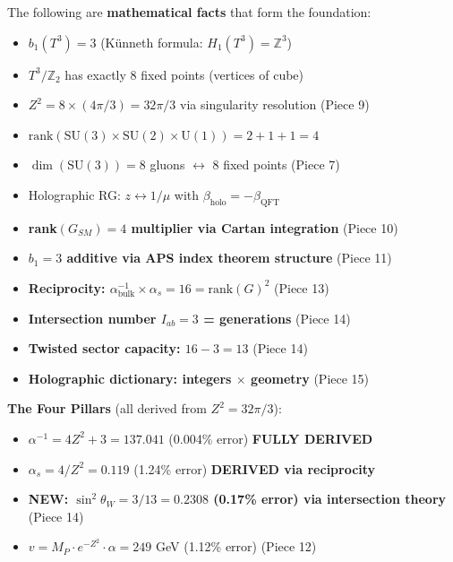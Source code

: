 \documentclass[12pt,a4paper]{article}
\newcommand{\sinW}{\sin^2\theta_W}
\newcommand{\Zsq}{Z^2}
\begin{document}
\begin{tcolorbox}[colback=green!10!white, colframe=green!60!black, title=What Is Established (v8.8.0)]
The following are \textbf{mathematical facts} that form the foundation:
\begin{itemize}[itemsep=0pt]
    \item[\checkmark] $b_1(T^3) = 3$ (K\"unneth formula: $H_1(T^3) = \mathbb{Z}^3$)
    \item[\checkmark] $T^3/\mathbb{Z}_2$ has exactly 8 fixed points (vertices of cube)
    \item[\checkmark] $\Zsq = 8 \times (4\pi/3) = 32\pi/3$ via singularity resolution (Piece 9)
    \item[\checkmark] $\text{rank}(\text{SU}(3) \times \text{SU}(2) \times \text{U}(1)) = 2 + 1 + 1 = 4$
    \item[\checkmark] $\dim(\text{SU}(3)) = 8$ gluons $\leftrightarrow$ 8 fixed points (Piece 7)
    \item[\checkmark] Holographic RG: $z \leftrightarrow 1/\mu$ with $\beta_{\text{holo}} = -\beta_{\text{QFT}}$
    \item[\checkmark] \textbf{rank$(G_{SM}) = 4$ multiplier via Cartan integration} (Piece 10)
    \item[\checkmark] \textbf{$b_1 = 3$ additive via APS index theorem structure} (Piece 11)
    \item[\checkmark] \textbf{Reciprocity: $\alpha^{-1}_{\text{bulk}} \times \alpha_s = 16 = \text{rank}(G)^2$} (Piece 13)
    \item[\checkmark] \textbf{Intersection number $I_{ab} = 3$ = generations} (Piece 14)
    \item[\checkmark] \textbf{Twisted sector capacity: $16 - 3 = 13$} (Piece 14)
    \item[\checkmark] \textbf{Holographic dictionary: integers $\times$ geometry} (Piece 15)
\end{itemize}
\textbf{The Four Pillars} (all derived from $\Zsq = 32\pi/3$):
\begin{itemize}[itemsep=0pt]
    \item $\alpha^{-1} = 4\Zsq + 3 = 137.041$ (0.004\% error) \textbf{FULLY DERIVED}
    \item $\alpha_s = 4/\Zsq = 0.119$ (1.24\% error) \textbf{DERIVED via reciprocity}
    \item \textbf{NEW: $\sinW = 3/13 = 0.2308$ (0.17\% error) via intersection theory} (Piece 14)
    \item $v = M_P \cdot e^{-\Zsq} \cdot \alpha = 249$ GeV (1.12\% error) (Piece 12)
\end{itemize}
\end{tcolorbox}
\end{document}
